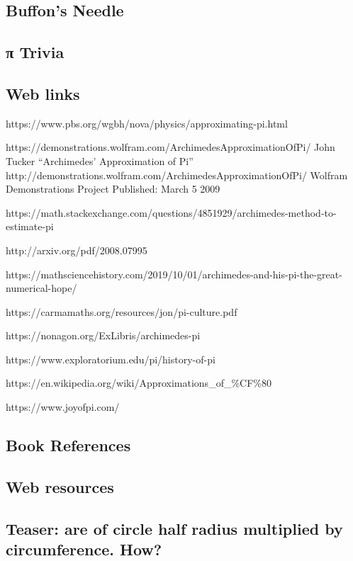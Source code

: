 \documentclass[
  a4paper,
]{article}
\begin{document}
\subsection{Buffon's Needle}\label{buffons-needle}

\subsection{π Trivia}\label{ux3c0-trivia}

\subsection{Web links}\label{web-links}

https://www.pbs.org/wgbh/nova/physics/approximating-pi.html

https://demonstrations.wolfram.com/ArchimedesApproximationOfPi/ John
Tucker ``Archimedes' Approximation of Pi''
http://demonstrations.wolfram.com/ArchimedesApproximationOfPi/ Wolfram
Demonstrations Project Published: March 5 2009

https://math.stackexchange.com/questions/4851929/archimedes-method-to-estimate-pi

http://arxiv.org/pdf/2008.07995

https://mathsciencehistory.com/2019/10/01/archimedes-and-his-pi-the-great-numerical-hope/

https://carmamaths.org/resources/jon/pi-culture.pdf

https://nonagon.org/ExLibris/archimedes-pi

https://www.exploratorium.edu/pi/history-of-pi

https://en.wikipedia.org/wiki/Approximations\_of\_\%CF\%80

https://www.joyofpi.com/

\subsection{Book References}\label{book-references}

\subsection{Web resources}\label{web-resources}

\subsection{Teaser: are of circle half radius multiplied by
circumference.
How?}\label{teaser-are-of-circle-half-radius-multiplied-by-circumference.-how}
\end{document}
